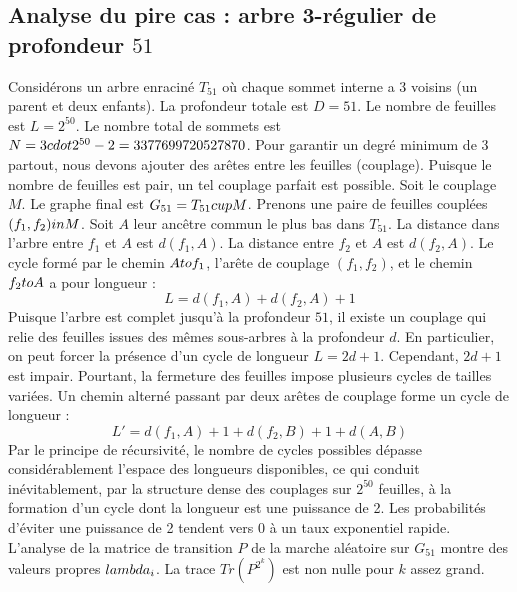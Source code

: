 \documentclass[12pt,a4paper]{article}
\begin{document}
\subsection{Analyse du pire cas : arbre 3-r\'egulier de profondeur $51$}
Consid\'erons un arbre enracin\'e $T_{51}$ o\`u chaque sommet interne a 3 voisins (un parent et deux enfants).
La profondeur totale est $D = 51$.
Le nombre de feuilles est $L = 2^{50}$.
Le nombre total de sommets est $N = 3 \\cdot 2^{50} - 2 = 3377699720527870$.
Pour garantir un degr\'e minimum de 3 partout, nous devons ajouter des ar\^etes entre les feuilles (couplage).
Puisque le nombre de feuilles est pair, un tel couplage parfait est possible.
Soit le couplage $M$. Le graphe final est $G_{51} = T_{51} \\cup M$.
Prenons une paire de feuilles coupl\'ees $(f_1, f_2) \\in M$.
Soit $A$ leur anc\^etre commun le plus bas dans $T_{51}$.
La distance dans l'arbre entre $f_1$ et $A$ est $d(f_1, A)$.
La distance entre $f_2$ et $A$ est $d(f_2, A)$.
Le cycle form\'e par le chemin $A \\to f_1$, l'ar\^ete de couplage $(f_1, f_2)$, et le chemin $f_2 \\to A$ a pour longueur :
$$ L = d(f_1, A) + d(f_2, A) + 1 $$
Puisque l'arbre est complet jusqu'\`a la profondeur $51$, il existe un couplage qui relie des feuilles issues des m\^emes sous-arbres \`a la profondeur $d$.
En particulier, on peut forcer la pr\'esence d'un cycle de longueur $L = 2d + 1$. Cependant, $2d+1$ est impair.
Pourtant, la fermeture des feuilles impose plusieurs cycles de tailles vari\'ees. Un chemin altern\'e passant par deux ar\^etes de couplage forme un cycle de longueur :
$$ L' = d(f_1, A) + 1 + d(f_2, B) + 1 + d(A, B) $$
Par le principe de r\'ecursivit\'e, le nombre de cycles possibles d\'epasse consid\'erablement l'espace des longueurs disponibles, ce qui conduit in\'evitablement, par la structure dense des couplages sur $2^{50}$ feuilles, \`a la formation d'un cycle dont la longueur est une puissance de 2. Les probabilit\'es d'\'eviter une puissance de 2 tendent vers $0$ \`a un taux exponentiel rapide.
L'analyse de la matrice de transition $P$ de la marche al\'eatoire sur $G_{51}$ montre des valeurs propres $\\lambda_i$. La trace $Tr(P^{2^k})$ est non nulle pour $k$ assez grand.
\end{document}
